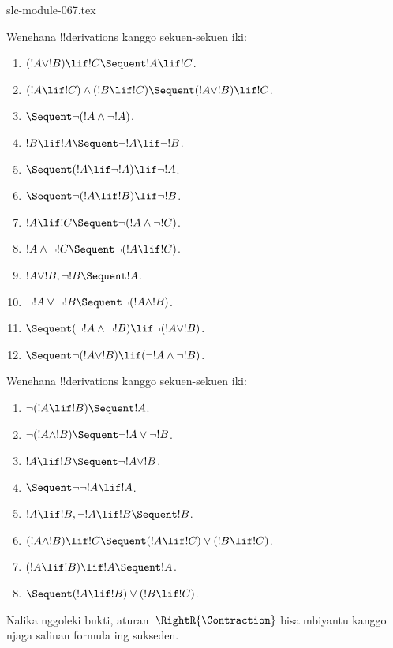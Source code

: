 \begin{filecontents*}[overwrite]{slc-module-067.tex}
\begin{prob}
Wenehana !!{derivation}s kanggo sekuen-sekuen iki:
\begin{enumerate}
\item $(!A \lor !B) \lif !C \Sequent !A \lif !C$.
\item $(!A \lif !C) \land (!B \lif !C) \Sequent (!A \lor !B) \lif !C$.
\item $\Sequent \lnot(!A \land \lnot !A)$.
\item $!B \lif !A \Sequent \lnot !A \lif \lnot !B$.
\item $\Sequent (!A \lif \lnot !A) \lif \lnot !A$.
\item $\Sequent \lnot(!A \lif !B) \lif \lnot !B$.
\item $!A \lif !C \Sequent \lnot (!A \land \lnot !C)$.
\item $!A \land \lnot !C \Sequent \lnot (!A \lif !C)$.
\item $!A \lor !B, \lnot !B \Sequent !A$.
\item $\lnot !A \lor \lnot !B \Sequent \lnot(!A \land !B)$.
\item $\Sequent (\lnot !A \land \lnot !B) \lif\lnot(!A \lor !B)$.
\item $\Sequent \lnot(!A \lor !B) \lif (\lnot !A \land \lnot !B)$.
\end{enumerate}
\end{prob}

\begin{prob}
Wenehana !!{derivation}s kanggo sekuen-sekuen iki:
\begin{enumerate}
\item $\lnot(!A \lif !B) \Sequent !A$.
\item $\lnot(!A \land !B) \Sequent \lnot !A \lor \lnot !B$.
\item $!A \lif !B \Sequent \lnot !A \lor !B$.
\item $\Sequent \lnot \lnot !A \lif !A$.
\item $!A \lif !B, \lnot !A \lif !B \Sequent !B$.
\item $(!A \land !B) \lif !C \Sequent (!A \lif !C) \lor (!B \lif !C)$.
\item $(!A \lif !B) \lif !A \Sequent !A$.
\item $\Sequent (!A \lif !B) \lor (!B \lif !C)$.
\end{enumerate}
Nalika nggoleki bukti, aturan~$\RightR{\Contraction}$ bisa mbiyantu kanggo
njaga salinan formula ing sukseden.
\end{prob}

\end{filecontents*}

